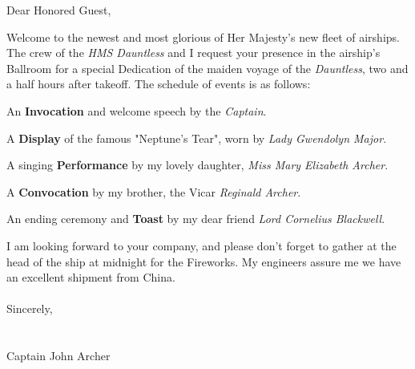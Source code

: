 \documentclass[white]{airship}
\begin{document}
\name{\wInvite{}} %
Dear Honored Guest,

Welcome to the newest and most glorious of Her Majesty's new fleet of airships. 
The crew of the {\it HMS Dauntless} and I request your presence in the airship's 
Ballroom for a special Dedication of the maiden voyage of the {\it Dauntless},
two and a half hours after takeoff. The schedule of events is as follows:

An {\bf Invocation} and welcome speech by the {\it Captain}.

A {\bf Display} of the famous "Neptune's Tear", worn by {\it Lady Gwendolyn Major}.

A singing {\bf Performance} by my lovely daughter, {\it Miss Mary Elizabeth Archer}.

A {\bf Convocation} by my brother, the Vicar {\it Reginald Archer}.

An ending ceremony and {\bf Toast} by my dear friend {\it Lord Cornelius Blackwell}.

I am looking forward to your company, and please don't forget to gather at the head of the ship at midnight for the Fireworks. My engineers assure me we have an excellent shipment from China.
\\
\\
Sincerely,
\\
\\
\\
Captain John Archer
\end{document}
